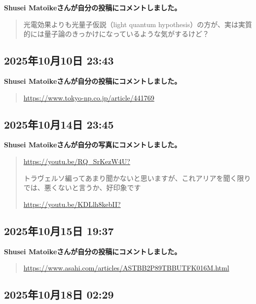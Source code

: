 \textbf{Shusei Matoikeさんが自分の投稿にコメントしました。}

\begin{quote}
光電効果よりも光量子仮説（light quantum hypothesis）の方が、実は実質的には量子論のきっかけになっているような気がするけど？
\end{quote}

\subsection*{2025年10月10日 23:43}

\textbf{Shusei Matoikeさんが自分の投稿にコメントしました。}

\begin{quote}
\url{https://www.tokyo-np.co.jp/article/441769}
\end{quote}

\subsection*{2025年10月14日 23:45}

\textbf{Shusei Matoikeさんが自分の写真にコメントしました。}

\begin{quote}
\url{https://youtu.be/RQ_SrKezW4U?}

トラヴェルソ編ってあまり聞かないと思いますが、これアリアを聞く限りでは、悪くないと言うか、好印象です

\url{https://youtu.be/KDLlh8kebII?}
\end{quote}

\subsection*{2025年10月15日 19:37}

\textbf{Shusei Matoikeさんが自分の投稿にコメントしました。}

\begin{quote}
\url{https://www.asahi.com/articles/ASTBB2P89TBBUTFK016M.html}
\end{quote}

\subsection*{2025年10月18日 02:29}

